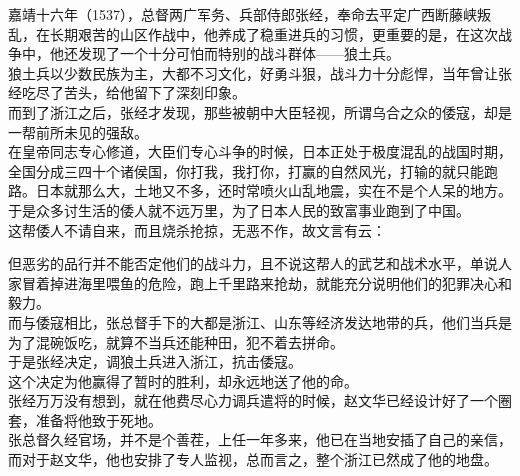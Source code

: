 \begin{multicols}{\theparacolNo}
嘉靖十六年（1537），总督两广军务、兵部侍郎张经，奉命去平定广西断藤峡叛乱，在长期艰苦的山区作战中，他养成了稳重进兵的习惯，更重要的是，在这次战争中，他还发现了一个十分可怕而特别的战斗群体——狼土兵。\\

狼土兵以少数民族为主，大都不习文化，好勇斗狠，战斗力十分彪悍，当年曾让张经吃尽了苦头，给他留下了深刻印象。\\

而到了浙江之后，张经才发现，那些被朝中大臣轻视，所谓乌合之众的倭寇，却是一帮前所未见的强敌。\\

在皇帝同志专心修道，大臣们专心斗争的时候，日本正处于极度混乱的战国时期，全国分成三四十个诸侯国，你打我，我打你，打赢的自然风光，打输的就只能跑路。日本就那么大，土地又不多，还时常喷火山乱地震，实在不是个人呆的地方。于是众多讨生活的倭人就不远万里，为了日本人民的致富事业跑到了中国。\\

这帮倭人不请自来，而且烧杀抢掠，无恶不作，故文言有云：\\

\begin{quote}
	\begin{spacing}{0.5}  %
		\textit{{\footnotesize
				\begin{description}
					\item[\textcolor{Gray}{\FA }] 倭人为寇，是为倭寇。
				\end{description}
		}}
	\end{spacing}
\end{quote}

但恶劣的品行并不能否定他们的战斗力，且不说这帮人的武艺和战术水平，单说人家冒着掉进海里喂鱼的危险，跑上千里路来抢劫，就能充分说明他们的犯罪决心和毅力。\\

而与倭寇相比，张总督手下的大都是浙江、山东等经济发达地带的兵，他们当兵是为了混碗饭吃，就算不当兵还能种田，犯不着去拼命。\\

于是张经决定，调狼土兵进入浙江，抗击倭寇。\\

这个决定为他赢得了暂时的胜利，却永远地送了他的命。\\

张经万万没有想到，就在他费尽心力调兵遣将的时候，赵文华已经设计好了一个圈套，准备将他致于死地。\\

张总督久经官场，并不是个善茬，上任一年多来，他已在当地安插了自己的亲信，而对于赵文华，他也安排了专人监视，总而言之，整个浙江已然成了他的地盘。\\


\end{multicols}
